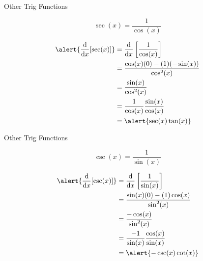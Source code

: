 \begin{frame}[t]{Other Trig Functions  }
\AnswerSpace{}

\[\sec(x)=\frac{1}{\cos(x)}\]\vfill\pause

\begin{align*}
\alert{\diff{}{x}[\sec(x)]} &= \ds\diff{}{x}\left[ \dfrac{1}{\cos(x)}\right]\\
&=\dfrac{\cos(x)(0)-(1)(-\sin(x))}{\cos^2(x)}\\
&=\dfrac{\sin(x)}{\cos^2(x)}\\
&=\dfrac{1}{\cos(x)}\dfrac{\sin(x)}{\cos(x)}\\
&= \alert{\sec(x)\tan(x)}
\end{align*}
\end{frame}
\begin{frame}[t]{Other Trig Functions  }
\AnswerSpace{}

\[\csc(x)=\frac{1}{\sin(x)}\]\vfill\pause

\begin{align*}
\alert{\diff{}{x}[\csc(x)]} &= \ds\diff{}{x}\left[ \dfrac{1}{\sin(x)}\right]\\
&=\dfrac{\sin(x)(0)-(1)\cos(x)}{\sin^2(x)}\\
&=\dfrac{-\cos(x)}{\sin^2(x)}\\
&=\dfrac{-1}{\sin(x)}\dfrac{\cos(x)}{\sin(x)}\\
&= \alert{-\csc(x)\cot(x)}
\end{align*}
\end{frame}

